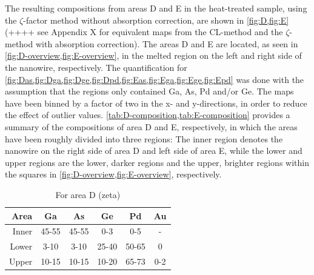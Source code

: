 The resulting compositions from areas D and E in the heat-treated sample, using the $\zeta$-factor method without absorption correction, are shown in \cref{fig:D,fig:E} (++++ see Appendix X for equivalent maps from the CL-method and the $\zeta$-method with absorption correction). The areas D and E are located, as seen in \cref{fig:D-overview,fig:E-overview}, in the melted region on the left and right side of the nanowire, respectively. The quantification for \cref{fig:Das,fig:Dga,fig:Dge,fig:Dpd,fig:Eas,fig:Ega,fig:Ege,fig:Epd} was done with the assumption that the regions only contained Ga, As, Pd and/or Ge. The maps have been binned by a factor of two in the x- and y-directions, in order to reduce the effect of outlier values. \cref{tab:D-composition,tab:E-composition} provides a summary of the compositions of area D and E, respectively, in which the areas have been roughly divided into three regions: The inner region denotes the nanowire on the right side of area D and left side of area E, while the lower and upper regions are the lower, darker regions and the upper, brighter regions within the squares in \cref{fig:D-overview,fig:E-overview}, respectively.


\begin{table}[h]
	\caption{For area D (zeta)}
	\begin{center}
		\begin{tabular}{r|ccccc}			
			Area & Ga & As & Ge & Pd & Au\\ 
			\midrule
			\hline
			Inner & 45-55& 45-55 & 0-3 & 0-5 & -\\
			Lower & 3-10& 3-10 & 25-40 & 50-65 & 0\\
			Upper & 10-15& 10-15 & 10-20 & 65-73 & 0-2\\
			\hline
		\end{tabular} 
	\end{center}
	\label{tab:D-composition}
\end{table}

